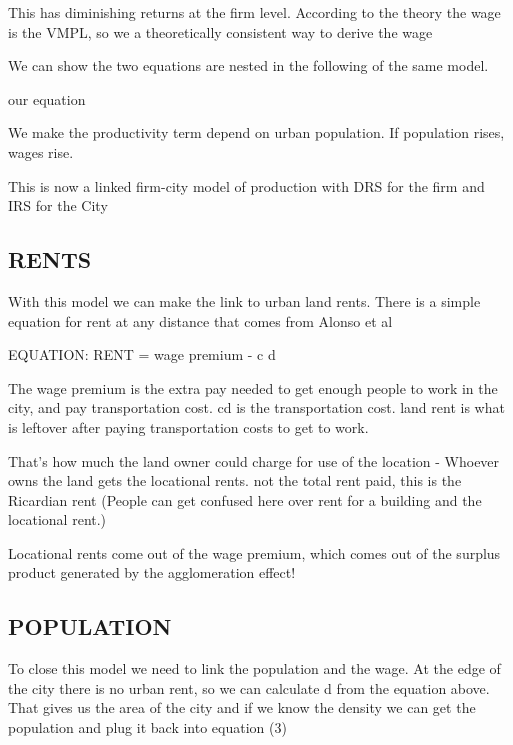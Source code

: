 \documentclass[]{article}
\begin{document}
\noindent This has diminishing returns at the firm level. According to the theory the wage is the VMPL, so we a theoretically consistent way to derive the wage

We can show the two equations are nested in the following of the same model.

\hspace{4cm}our equation

\noindent We make the productivity term depend on urban population. If population rises, wages rise.

This is now a linked firm-city model of production with DRS for the firm and IRS for the City

\subsection{RENTS}
With this model we can make the link to urban land rents. There is a simple equation for rent at any distance that comes from Alonso et al

\hspace{2cm}EQUATION:  RENT = wage premium - c d

\noindent The wage premium is the extra pay needed to get enough people to work in the city, and pay transportation cost. cd is the transportation cost. land rent is what is leftover after paying transportation costs to get to work.

That’s how much the land owner could charge for use of the location - Whoever owns the land gets the locational rents. not the total rent paid, this is the Ricardian rent (People can get confused here over rent for a building and the locational rent.)

Locational rents come out of the wage premium, which comes out of the surplus product generated by the agglomeration effect!

\subsection{POPULATION}

To close this model we need to link the population and the wage. At the edge of the city there is no urban rent, so we can calculate d from the equation above. That gives us the area of the city and if we know the density we can get the population and plug it back into equation (3)

\end{document}
